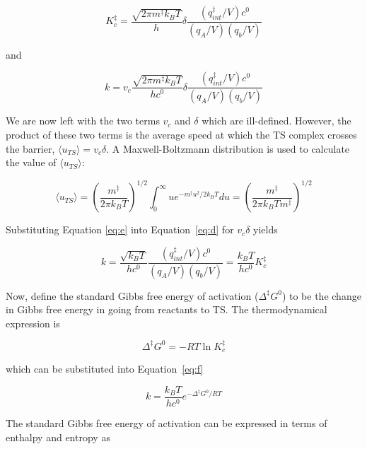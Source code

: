 \begin{equation}
  K_c^{\ddagger} =  \frac{\sqrt{2\pi m^\ddagger k_B T}}{h}\delta\frac{(q_{int}^\ddagger/V)c^0}{(q_A/V)(q_b/V)}
\end{equation}

\noindent and

\begin{equation}
 k = v_c \frac{\sqrt{2\pi m^\ddagger
     k_B T}}{hc^0}\delta\frac{(q_{int}^\ddagger/V)c^0}{(q_A/V)(q_b/V)}
\label{eq:d}
\end{equation}

We are now left with the two terms $v_c$ and $\delta$ which are ill-defined.
However, the product of these two terms is the average speed at which the TS
complex crosses the barrier, $\langle u_{TS} \rangle = v_c\delta$. A
Maxwell-Boltzmann distribution is used to calculate the value of $\langle
u_{TS} \rangle$:

\begin{equation}
  \langle u_{TS} \rangle = \left( \frac{m^\ddagger}{2\pi k_B T} \right)^{1/2}
  \int_0^\infty u e^{-m^\ddagger u^2/2k_B T}du = \left( \frac{m^\ddagger}{2\pi
      k_B T m^\ddagger} \right)^{1/2}
\label{eq:e}
\end{equation}

\noindent Substituting Equation \ref{eq:e} into Equation~\ref{eq:d} for
$v_c\delta$ yields

\begin{equation}
  k =
  \frac{\sqrt{k_B T}}{hc^0}\frac{(q_{int}^\ddagger/V)c^0}{(q_A/V)(q_b/V)} = \frac{k_B T}{hc^0}K_c^\ddagger
\label{eq:f}
\end{equation}

Now, define the standard Gibbs free energy of activation ($\Delta ^\ddagger
G^0$) to be the change in Gibbs free energy in going from reactants to TS.\@
The thermodynamical expression is

\begin{equation}
  \Delta ^\ddagger G^0 = -RT \ln K_c^\ddagger
\end{equation}

\noindent which can be substituted into Equation~\ref{eq:f}

\begin{equation}
  k = \frac{k_B T}{hc^0} e^{-\Delta^\ddagger G^0/RT}
\label{eq:g}
\end{equation}

The standard Gibbs free energy of activation can be expressed in terms of
enthalpy and entropy as

